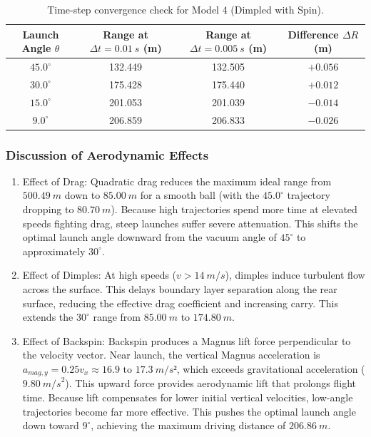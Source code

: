 \documentclass[12pt]{article}
\numberwithin{equation}{subsection}
\begin{document}
\begin{table}[h]
\centering
\caption{Time-step convergence check for Model 4 (Dimpled with Spin).}
\label{tab:dt_check}
\begin{tabular}{cccc}
\hline
\textbf{Launch Angle} $θ$ & \textbf{Range at $Δ t = 0.01~\si{s}$ (m)} & \textbf{Range at $Δ t = 0.005~\si{s}$ (m)} & \textbf{Difference $Δ R$ (m)} \\ \hline
$45.0^∘$ & 132.449 & 132.505 & $+0.056$ \\
$30.0^∘$ & 175.428 & 175.440 & $+0.012$ \\
$15.0^∘$ & 201.053 & 201.039 & $-0.014$ \\
$9.0^∘$  & 206.859 & 206.833 & $-0.026$ \\ \hline
\end{tabular}
\end{table}

\subsubsection*{Discussion of Aerodynamic Effects}
\begin{enumerate}
    \item Effect of Drag: Quadratic drag reduces the maximum ideal range from $500.49~\si{m}$ down to $85.00~\si{m}$ for a smooth ball (with the $45.0^\circ$ trajectory dropping to $80.70~\si{m}$). Because high trajectories spend more time at elevated speeds fighting drag, steep launches suffer severe attenuation. This shifts the optimal launch angle downward from the vacuum angle of $45^\circ$ to approximately $30^\circ$.
    \item Effect of Dimples: At high speeds ($v > 14~\si{m/s}$), dimples induce turbulent flow across the surface. This delays boundary layer separation along the rear surface, reducing the effective drag coefficient and increasing carry. This extends the $30^\circ$ range from $85.00~\si{m}$ to $174.80~\si{m}$.
    \item Effect of Backspin: Backspin produces a Magnus lift force perpendicular to the velocity vector. Near launch, the vertical Magnus acceleration is $a_{\si{mag}, y} = 0.25 v_x ≈ 16.9\text{ to }17.3~\si{m/s}²$, which exceeds gravitational acceleration ($9.80~\si{m/s}^2$). This upward force provides aerodynamic lift that prolongs flight time. Because lift compensates for lower initial vertical velocities, low-angle trajectories become far more effective. This pushes the optimal launch angle down toward $9^\circ$, achieving the maximum driving distance of $206.86~\si{m}$.
\end{enumerate}
\end{document}
